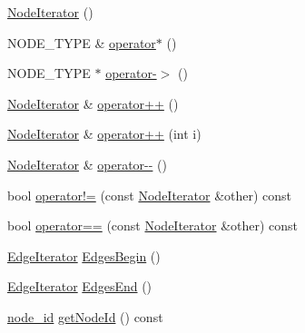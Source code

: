 \begin{DoxyCompactItemize}
\item 
\hyperlink{class_complex_network_1_1_node_iterator_a266ccc2707ab96467bba59424b4e9478}{Node\+Iterator} ()
\item 
N\+O\+D\+E\+\_\+\+T\+Y\+P\+E \& \hyperlink{class_complex_network_1_1_node_iterator_a8df24d0aab8add9cad30afc5978336f6}{operator$\ast$} ()
\item 
N\+O\+D\+E\+\_\+\+T\+Y\+P\+E $\ast$ \hyperlink{class_complex_network_1_1_node_iterator_abafef53f99216420c5af113dff7a2f0c}{operator-\/$>$} ()
\item 
\hyperlink{class_complex_network_1_1_node_iterator}{Node\+Iterator} \& \hyperlink{class_complex_network_1_1_node_iterator_a929bbb0f6082dc7e2c8baf0c7e49c723}{operator++} ()
\item 
\hyperlink{class_complex_network_1_1_node_iterator}{Node\+Iterator} \& \hyperlink{class_complex_network_1_1_node_iterator_a57c93ae286b9cec9470353470ee7cdc4}{operator++} (int i)
\item 
\hyperlink{class_complex_network_1_1_node_iterator}{Node\+Iterator} \& \hyperlink{class_complex_network_1_1_node_iterator_a17ea3657a6ace86eb8c3a65a795e96b6}{operator-\/-\/} ()
\item 
bool \hyperlink{class_complex_network_1_1_node_iterator_a3b0cde4c6ba33997b3ac303c9f6f6f88}{operator!=} (const \hyperlink{class_complex_network_1_1_node_iterator}{Node\+Iterator} \&other) const 
\item 
bool \hyperlink{class_complex_network_1_1_node_iterator_a287abe994f083023c56bed9a432312c9}{operator==} (const \hyperlink{class_complex_network_1_1_node_iterator}{Node\+Iterator} \&other) const 
\item 
\hyperlink{class_complex_network_1_1_edge_iterator}{Edge\+Iterator} \hyperlink{class_complex_network_1_1_node_iterator_abdcefabe565220ce6b02f5fc07d099ca}{Edges\+Begin} ()
\item 
\hyperlink{class_complex_network_1_1_edge_iterator}{Edge\+Iterator} \hyperlink{class_complex_network_1_1_node_iterator_a7c287b1c6815d2c9c760d2c7032bd19f}{Edges\+End} ()
\item 
\hyperlink{_complex_network_8hpp_a8323334ca788fde39682469321590d52}{node\+\_\+id} \hyperlink{class_complex_network_1_1_node_iterator_abc8c196760bc0dc061310f84c8cdb38c}{get\+Node\+Id} () const 
\end{DoxyCompactItemize}
